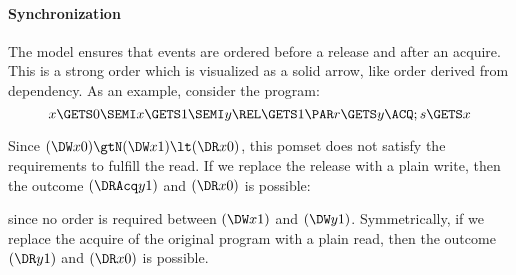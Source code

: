 \paragraph{Synchronization}
The model ensures that events are ordered before a release and after an
acquire.  This is a strong order which is visualized as a solid arrow, like
order derived from dependency.  As an example, consider the program:
\begin{displaymath}
  x\GETS0\SEMI %
  x\GETS 1\SEMI y \REL\GETS1 \PAR r\GETS y\ACQ; s\GETS x
\end{displaymath}
  \hfill
\begin{tikzinline}[node distance=1em]
\end{tikzinline}
\hfill{}\hfill
\begin{tikzinline}[node distance=1em, baseline={([yshift=-1.5ex]current bounding box.west)}]
\end{tikzinline}
\hfill\hbox{}

\smallskip
\noindent
Since $(\DW x0) \gtN (\DW x1) \lt (\DR x0)$, this pomset does not satisfy the
requirements to fulfill the read.
If we replace the release
with a plain write, then the outcome $(\DRAcq y1)$ and $(\DR x0)$ is possible:
\begin{tikzdisplay}[node distance=1em]
\end{tikzdisplay}
since no order is required between $(\DW x1)$ and $(\DW y1)$.  
Symmetrically, if we replace the acquire of the original program
with a plain read, then the outcome $(\DR y1)$ and $(\DR x0)$ is possible.


